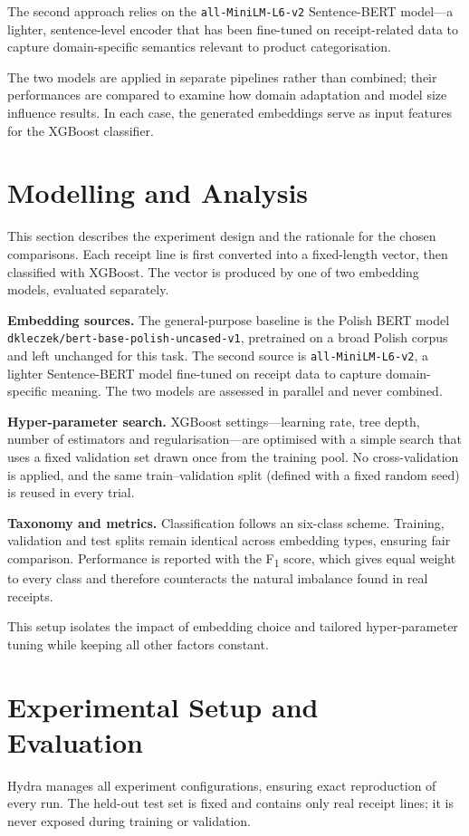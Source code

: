 \documentclass{SGGW-thesis-EN}
\begin{document}
The second approach relies on the \texttt{all-MiniLM-L6-v2} Sentence-BERT model—a lighter, sentence-level encoder that
has been fine-tuned on receipt-related data to capture domain-specific semantics relevant to product categorisation.

The two models are applied in separate pipelines rather than combined; their performances are compared to examine how
domain adaptation and model size influence results.  In each case, the generated embeddings serve as input features for
the XGBoost classifier.



\section{Modelling and Analysis}
This section describes the experiment design and the rationale for the chosen comparisons. Each receipt line is first
converted into a fixed-length vector, then classified with XGBoost. The vector is produced by one of two embedding
models, evaluated separately.

\textbf{Embedding sources.} The general-purpose baseline is the Polish BERT model
\texttt{dkleczek/bert-base-polish-uncased-v1}, pretrained on a broad Polish corpus and left unchanged for this task. The
second source is \texttt{all-MiniLM-L6-v2}, a lighter Sentence-BERT model fine-tuned on receipt data to capture
domain-specific meaning. The two models are assessed in parallel and never combined.

\textbf{Hyper-parameter search.} XGBoost settings—learning rate, tree depth, number of estimators and regularisation—are
optimised with a simple search that uses a fixed validation set drawn once from the training pool. No cross-validation
is applied, and the same train–validation split (defined with a fixed random seed) is reused in every trial.

\textbf{Taxonomy and metrics.} Classification follows an six-class scheme. Training, validation and test splits remain
identical across embedding types, ensuring fair comparison. Performance is reported with the
F\textsubscript{1} score, which gives equal weight to every class and therefore counteracts the natural imbalance found
in real receipts.

This setup isolates the impact of embedding choice and tailored hyper-parameter tuning while keeping all other factors
constant.

\section{Experimental Setup and Evaluation}
Hydra manages all experiment configurations, ensuring exact reproduction of every run. The held-out test set is fixed
and contains only real receipt lines; it is never exposed during training or validation.
\end{document}
